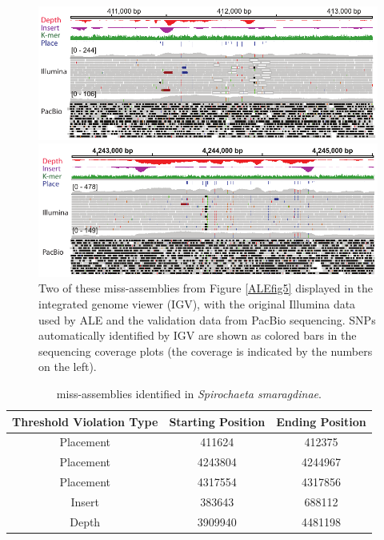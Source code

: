 \documentclass[phd,tocprelim]{cornell}
\begin{document}
\begin{figure}[!tpb]%
    \centerline{\includegraphics[width=\textwidth]{figures/ALE/fig5_mid.pdf}}
    \centerline{\includegraphics[width=\textwidth]{figures/ALE/fig5_bot.pdf}}
    \caption[ALE real reads: IGV of miss-assemblies]{Two of these miss-assemblies from Figure \ref{ALEfig5} displayed in the integrated genome viewer (IGV), with the original Illumina data used by ALE and the validation data from PacBio sequencing. SNPs automatically identified by IGV are shown as colored bars in the sequencing coverage plots (the coverage is indicated by the numbers on the left).}\label{ALEfig5p2}
\end{figure}

\begin{table}[!htp]
    \caption{miss-assemblies identified in {\it Spirochaeta smaragdinae}.}
    \label{ALEtab1}
    \begin{center}
\begin{tabular}{c|c|c}
Threshold Violation Type & Starting Position & Ending Position\\\hline
Placement & 411624 & 412375\\
Placement & 4243804 & 4244967\\
Placement & 4317554 & 4317856\\
Insert & 383643 & 688112\\
Depth & 3909940 & 4481198\\
\end{tabular}
\end{center}
\end{table}
\end{document}
